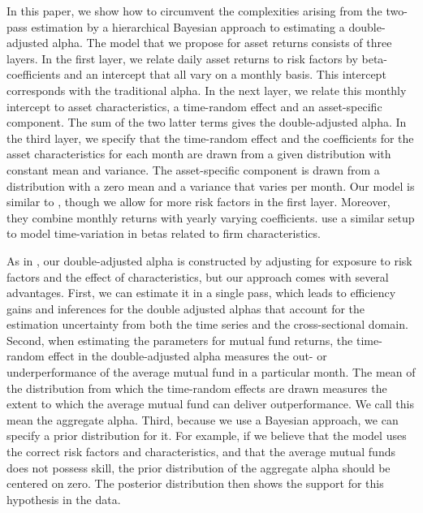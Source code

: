 In this paper, we show how to circumvent the complexities arising from the two-pass estimation by a hierarchical Bayesian approach to estimating a double-adjusted alpha. The model that we propose for asset returns consists of three layers. In the first layer, we relate daily asset returns to risk factors by beta-coefficients and an intercept that all vary on a monthly basis. This intercept corresponds with the traditional alpha. In the next layer, we relate this monthly intercept to asset characteristics, a time-random effect and an asset-specific component. The sum of the two latter terms gives the double-adjusted alpha. In the third layer, we specify that the time-random effect and the coefficients for the asset characteristics for each month are drawn from a given distribution with constant mean and variance. The asset-specific component is drawn from a distribution with a zero mean and a variance that varies per month. Our model is similar to \citet{cederburg2015asset}, though we allow for more risk factors in the first layer. Moreover, they combine monthly returns with yearly varying coefficients. \citet{cosemans2015estimating} use a similar setup to model time-variation in betas related to firm characteristics.

As in \citet{busse2017double}, our double-adjusted alpha is constructed by adjusting for exposure to risk factors and the effect of characteristics, but our approach comes with several advantages. First, we can estimate it in a single pass, which leads to efficiency gains and inferences for the double adjusted alphas that account for the estimation uncertainty from both the time series and the cross-sectional domain. Second, when estimating the parameters for mutual fund returns, the time-random effect in the double-adjusted alpha measures the out- or underperformance of the average mutual fund in a particular month. The mean of the distribution from which the time-random effects are drawn measures the extent to which the average mutual fund can deliver outperformance. We call this mean the aggregate alpha. Third, because we use a Bayesian approach, we can specify a prior distribution for it. For example, if we believe that the model uses the correct risk factors and characteristics, and that the average mutual funds does not possess skill, the prior distribution of the aggregate alpha should be centered on zero. The posterior distribution then shows the support for this hypothesis in the data.

